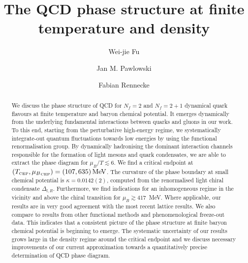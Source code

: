 \documentclass[%
reprint,
superscriptaddress,
showpacs,preprintnumbers,
 amsmath,amssymb,
 aps,
prd,
]{revtex4-1}
\begin{document}
\preprint{}

\title{The QCD phase structure at finite temperature and density} 

\author{Wei-jie Fu}


\author{Jan M. Pawlowski}

 \author{Fabian Rennecke}


\begin{abstract}
  We discuss the phase structure of QCD for $N_f=2$ and $N_f=2+1$
  dynamical quark flavours at finite temperature and baryon chemical
  potential. It emerges dynamically from the underlying fundamental
  interactions between quarks and gluons in our work. To this end,
  starting from the perturbative high-energy regime, we systematically
  integrate-out quantum fluctuations towards low energies by using the
  functional renormalisation group. By dynamically hadronising the
  dominant interaction channels responsible for the formation of light
  mesons and quark condensates, we are able to extract the phase
  diagram for \mbox{$\mu_B/T \lesssim 6$}.  We find a critical endpoint
    at
    \mbox{$(T_\text{\tiny CEP},{\mu_B}_{\text{\tiny CEP}})=(107,
      635)\,\text{MeV}$}. The curvature of the phase boundary at small
    chemical potential is $\kappa=0.0142(2)$, computed from the
    renormalised light chiral condensate $\Delta_{l,R}$.  Furthermore,
    we find indications for an inhomogeneous regime in the vicinity
    and above the chiral transition for $\mu_B\gtrsim 417$\,
    MeV. Where applicable, our results are in very good agreement with
    the most recent lattice results. We also compare to results from
    other functional methods and phenomenological freeze-out
    data. This indicates that a consistent picture of the phase
    structure at finite baryon chemical potential is beginning to
    emerge. The systematic uncertainty of our results grows large in
    the density regime around the critical endpoint and we discuss
    necessary improvements of our current approximation towards a
    quantitatively precise determination of QCD phase diagram.
\end{abstract}
\end{document}

